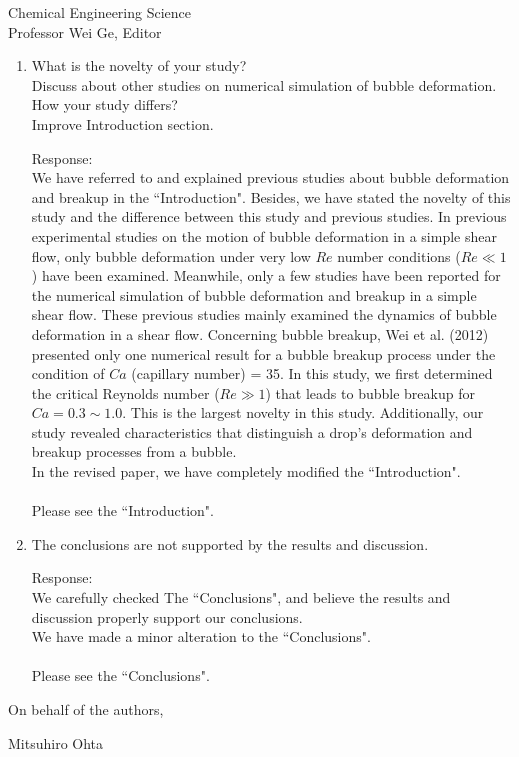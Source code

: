 \documentclass{letter}
\begin{document}
\begin{letter}{
Chemical Engineering Science\\
Professor Wei Ge, Editor\\}
\begin{enumerate}
\par\noindent
\item
\textsf
{What is the novelty of your study?\\
Discuss about other studies on numerical simulation of bubble deformation. How your study differs?\\
Improve Introduction section.\\}
\vspace{3 mm}

Response: \\
We have referred to and explained previous studies about bubble deformation and breakup in the ``Introduction".
Besides, we have stated the novelty of this study and the difference between this study and previous studies.
In previous experimental studies on the motion of bubble deformation in a simple shear flow, only bubble deformation under very 
low $Re$ number conditions ($Re \ll 1$) have been examined.  
Meanwhile, only a few studies have been reported for the numerical simulation of bubble deformation and breakup in a simple shear flow.
These previous studies mainly examined the dynamics of bubble deformation in a shear flow.
Concerning bubble breakup, Wei et al. (2012) presented only one numerical result for a bubble breakup process under 
the condition of $Ca$ (capillary number) = 35.  
In this study, we first determined the critical Reynolds number ($Re \gg 1$) that leads to bubble breakup for $Ca = 0.3 \sim 1.0$.
This is the largest novelty in this study.
Additionally, our study revealed characteristics that distinguish a drop's deformation and breakup processes from a bubble.\\
In the revised paper, we have completely modified the ``Introduction".  \\
\\
Please see the ``Introduction".
\\

\par\noindent
\item
\textsf
{The conclusions are not supported by the results and discussion.}
\vspace{3 mm}

Response: \\
We carefully checked The ``Conclusions", and believe the results and discussion properly support our conclusions.\\
We have made a minor alteration to the  ``Conclusions".\\
\\
Please see the ``Conclusions".
\\


\end{enumerate}

\closing{On behalf of the authors,}
Mitsuhiro Ohta

\end{letter}
\end{document}
